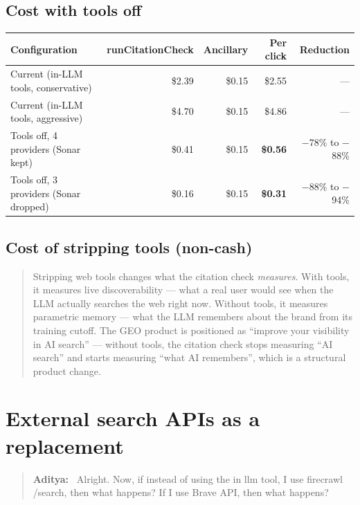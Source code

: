 \documentclass[11pt,letterpaper]{article}
\newenvironment{userturn}
  {\begin{quote}\small\color{brand}\textbf{Aditya:}~}
  {\end{quote}}
\newcommand{\good}[1]{\textcolor{good}{#1}}
\begin{document}
\subsection{Cost with tools off}

\begin{center}
\begin{tabular}{@{}lrrrr@{}}
\toprule
\textbf{Configuration} & \textbf{runCitationCheck} & \textbf{Ancillary} & \textbf{Per click} & \textbf{Reduction} \\
\midrule
Current (in-LLM tools, conservative) & \$2.39 & \$0.15 & \$2.55 & --- \\
Current (in-LLM tools, aggressive)   & \$4.70 & \$0.15 & \$4.86 & --- \\
Tools off, 4 providers (Sonar kept)  & \$0.41 & \$0.15 & \textbf{\$0.56} & \good{$-$78\% to $-$88\%} \\
Tools off, 3 providers (Sonar dropped) & \$0.16 & \$0.15 & \textbf{\$0.31} & \good{$-$88\% to $-$94\%} \\
\bottomrule
\end{tabular}
\end{center}

\subsection{Cost of stripping tools (non-cash)}

\begin{quote}
Stripping web tools changes what the citation check \textit{measures}. With
tools, it measures live discoverability --- what a real user would see when
the LLM actually searches the web right now. Without tools, it measures
parametric memory --- what the LLM remembers about the brand from its
training cutoff. The GEO product is positioned as ``improve your visibility
in AI search'' --- without tools, the citation check stops measuring
``AI search'' and starts measuring ``what AI remembers'', which is a
structural product change.
\end{quote}

\section{External search APIs as a replacement}

\begin{userturn}
Alright. Now, if instead of using the in llm tool, I use firecrawl /search,
then what happens? If I use Brave API, then what happens?
\end{userturn}
\end{document}
